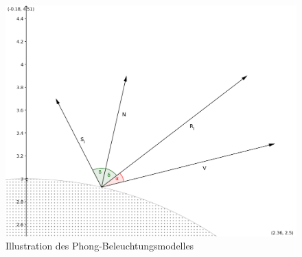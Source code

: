 \begin{figure}[H]\label{fig:phong_illustration}
    \centering
    \includegraphics[width=1.0\textwidth]{img/phong_illustration.png}
    \caption{Illustration des Phong-Beleuchtungsmodelles\protect\footnotemark}
\end{figure}

